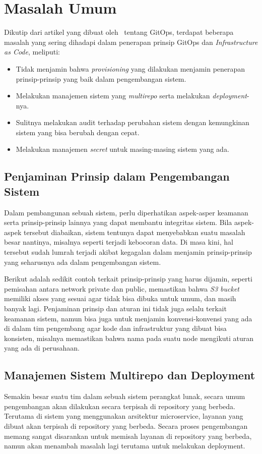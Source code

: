 \section{Masalah Umum}\label{problems}

Dikutip dari artikel yang dibuat oleh~\cite{chrisward} tentang GitOps, terdapat beberapa masalah yang sering dihadapi dalam penerapan prinsip GitOps dan \textit{Infrastructure as Code}, meliputi:

\begin{itemize}
  \item Tidak menjamin bahwa \textit{provisioning} yang dilakukan menjamin penerapan prinsip-prinsip yang baik dalam pengembangan sistem.
  \item Melakukan manajemen sistem yang \textit{multirepo} serta melakukan \textit{deployment}-nya.
  \item Sulitnya melakukan audit terhadap perubahan sistem dengan kemungkinan sistem yang bisa berubah dengan cepat.
  \item Melakukan manajemen \textit{secret} untuk masing-masing sistem yang ada.
\end{itemize}

\subsection{Penjaminan Prinsip dalam Pengembangan Sistem}

Dalam pembangunan sebuah sistem, perlu diperhatikan aspek-asper keamanan serta prinsip-prinsip lainnya yang dapat membantu integritas sistem. Bila aspek-aspek tersebut diabaikan, sistem tentunya dapat menyebabkan suatu masalah besar nantinya, misalnya seperti terjadi kebocoran data. Di masa kini, hal tersebut sudah lumrah terjadi akibat kegagalan dalam menjamin prinsip-prinsip yang seharusnya ada dalam pengembangan sistem.

Berikut adalah sedikit contoh terkait prinsip-prinsip yang harus dijamin, seperti pemisahan antara network private dan public, memastikan bahwa \textit{S3 bucket} memiliki akses yang sesuai agar tidak bisa dibuka untuk umum, dan masih banyak lagi. Penjaminan prinsip dan aturan ini tidak juga selalu terkait keamanan sistem, namun bisa juga untuk menjamin konvensi-konvensi yang ada di dalam tim pengembang agar kode dan infrastruktur yang dibuat bisa konsisten, misalnya memastikan bahwa nama pada suatu node mengikuti aturan yang ada di perusahaan.

\subsection{Manajemen Sistem Multirepo dan Deployment}
Semakin besar suatu tim dalam sebuah sistem perangkat lunak, secara umum pengembangan akan dilakukan secara terpisah di repository yang berbeda. Terutama di sistem yang menggunakan arsitektur microservice, layanan yang dibuat akan terpisah di repository yang berbeda. Secara proses pengembangan memang sangat disarankan untuk memisah layanan di repository yang berbeda, namun akan menambah masalah lagi terutama untuk melakukan deployment.

